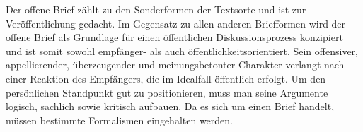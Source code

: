 



\thispagestyle{plain}



Der offene Brief z\"{a}hlt zu den Sonderformen der Textsorte  und ist zur Ver\"{o}ffentlichung gedacht. Im Gegensatz zu allen anderen Briefformen wird der offene Brief als Grundlage f\"{u}r einen \"{o}ffentlichen
Diskussionsprozess konzipiert und ist somit sowohl empf\"{a}nger- als auch \"{o}ffentlichkeitsorientiert. Sein offensiver, appellierender, \"{u}berzeugender und meinungsbetonter Charakter verlangt nach einer Reaktion des Empf\"{a}ngers, die im Idealfall \"{o}ffentlich erfolgt. Um den pers\"{o}nlichen Standpunkt gut zu positionieren, muss man seine Argumente logisch, sachlich sowie kritisch aufbauen. Da es sich um einen Brief handelt, m\"{u}ssen bestimmte Formalismen eingehalten werden.


